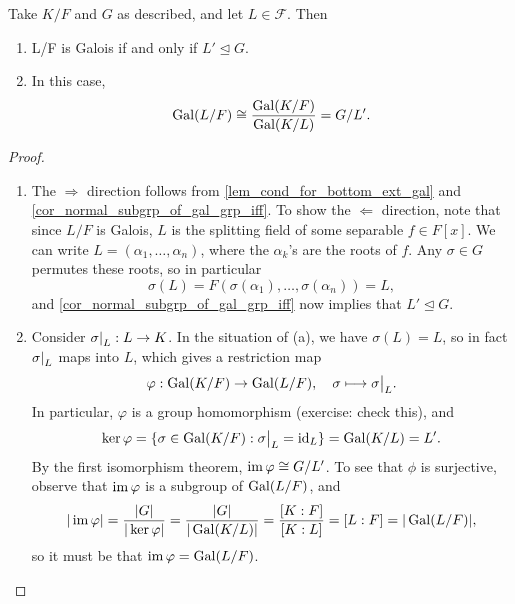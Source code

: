 \begin{proposition}
\label{prop_addendum_fund_thm_of_gal_thy}
    Take $K/F$ and $G$ as described, and let $L \in \mathcal{F}$. Then
    \begin{enumerate}[label=(\alph*)]
        \item L/F is Galois if and only if $L' \unlhd G$.
        \item In this case,
        \[
            \operatorname{Gal}(L/F) \cong \frac{\operatorname{Gal}(K/F)}{\operatorname{Gal}(K/L)} = G/L'.
        \]
    \end{enumerate}
\end{proposition}

\begin{proof}~
    \begin{enumerate}[label=(\alph*)]
        \item The $\Rightarrow$ direction follows from \cref{lem_cond_for_bottom_ext_gal} and \cref{cor_normal_subgrp_of_gal_grp_iff}. To show the $\Leftarrow$ direction, note that since $L/F$ is Galois, $L$ is the splitting field of some separable $f \in F[x]$. We can write $L = (\alpha_1, \ldots, \alpha_n)$, where the $\alpha_k$'s are the roots of $f$. Any $\sigma \in G$ permutes these roots, so in particular
        \[
            \sigma(L) = F(\sigma(\alpha_1), \ldots, \sigma(\alpha_n)) = L,
        \]
        and \cref{cor_normal_subgrp_of_gal_grp_iff} now implies that $L' \unlhd G$.

        \item Consider $\restr{\sigma}{L}: L \to K$. In the situation of (a), we have $\sigma(L) = L$, so in fact $\restr{\sigma}{L}$ maps into $L$, which gives a restriction map
        \[
            \varphi: \gal(K/F) \to \gal(L/F), \quad \sigma \longmapsto \restr{\sigma}{L}.
        \]
        In particular, $\varphi$ is a group homomorphism (exercise: check this), and
        \[
            \ker{\varphi} = \{\sigma \in \gal(K/F): \restr{\sigma}{L} = \id_L\} = \gal(K/L) = L'.
        \]
        By the first isomorphism theorem, $\operatorname{im}{\varphi} \cong G/L'$. To see that $\phi$ is surjective, observe that $\operatorname{im}{\varphi}$ is a subgroup of $\operatorname{Gal}(L/F)$, and
        \[
            |\operatorname{im}{\varphi}| = \frac{|G|}{|\ker{\varphi}|} = \frac{|G|}{|\operatorname{Gal}(K/L)|} = \frac{[K : F]}{[K : L]} = [L : F] = |\operatorname{Gal}(L/F)|,
        \]
        so it must be that $\operatorname{im}{\varphi} = \operatorname{Gal}(L/F)$.
        \qedhere
    \end{enumerate}
\end{proof}

